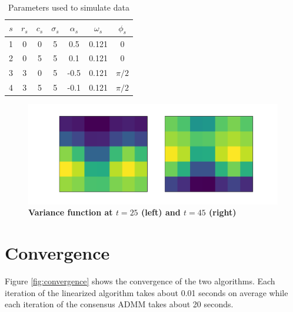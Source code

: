 \documentclass[12pt]{article}
\begin{document}
\begin{table}[t]
	\caption{Parameters used to simulate data}
	\label{tab:sim_params}
	\vskip 0.15in
	\begin{center}
		\begin{small}
			\begin{sc}
				\begin{tabular}{ccccccc}
					\hline

					$s$ & $r_s$ & $c_s$ & $\sigma_s$ &$\alpha_s$ & $\omega_s$ & $\phi_s$\\
					\hline
					1 & 0 & 0 & 5 & 0.5 & 0.121 & 0 \\
					2 & 0 & 5 & 5 & 0.1 & 0.121 & 0 \\
					3 & 3 & 0 & 5 & -0.5 & 0.121 & $\pi/2$ \\
					4 & 3 & 5 & 5 & -0.1 & 0.121 & $\pi/2$ \\
					\hline
				\end{tabular}
			\end{sc}
		\end{small}
	\end{center}
	\vskip -0.1in
\end{table} 

\begin{figure}[!h]
	\centering	
	\includegraphics[width=.7\linewidth]{Figures/true_var_spatial}		
	
	\caption{{\bf Variance function at $t=25$ (left) and $t=45$ (right)}} \label{fig:true_var_spatial}
\end{figure}

\section{Convergence}
Figure \ref{fig:convergence} shows the convergence of the two algorithms. Each iteration of the linearized algorithm takes about 0.01 seconds on average while each iteration of the consensus ADMM takes about 20 seconds. 
\end{document}
